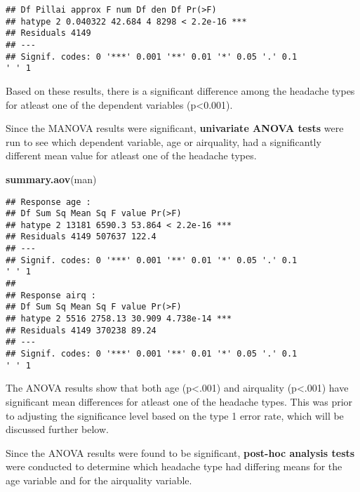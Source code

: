 \documentclass[]{article}
\newenvironment{Shaded}{\begin{snugshade}}{\end{snugshade}}
\newcommand{\KeywordTok}[1]{\textcolor[rgb]{0.13,0.29,0.53}{\textbf{#1}}}
\newcommand{\NormalTok}[1]{#1}
\newcommand{\OperatorTok}[1]{\textcolor[rgb]{0.81,0.36,0.00}{\textbf{#1}}}
\newcommand{\StringTok}[1]{\textcolor[rgb]{0.31,0.60,0.02}{#1}}
\begin{document}
\begin{verbatim}
## Df Pillai approx F num Df den Df Pr(>F)
## hatype 2 0.040322 42.684 4 8298 < 2.2e-16 ***
## Residuals 4149
## ---
## Signif. codes: 0 '***' 0.001 '**' 0.01 '*' 0.05 '.' 0.1
' ' 1
\end{verbatim}

Based on these results, there is a significant difference among the
headache types for atleast one of the dependent variables
(p\textless{}0.001).

Since the MANOVA results were significant, \textbf{univariate ANOVA
tests} were run to see which dependent variable, age or airquality, had
a significantly different mean value for atleast one of the headache
types.

\begin{Shaded}
\begin{Highlighting}[]
\KeywordTok{summary.aov}\NormalTok{(man) }
\end{Highlighting}
\end{Shaded}

\begin{verbatim}
## Response age :
## Df Sum Sq Mean Sq F value Pr(>F)
## hatype 2 13181 6590.3 53.864 < 2.2e-16 ***
## Residuals 4149 507637 122.4
## ---
## Signif. codes: 0 '***' 0.001 '**' 0.01 '*' 0.05 '.' 0.1
' ' 1
##
## Response airq :
## Df Sum Sq Mean Sq F value Pr(>F)
## hatype 2 5516 2758.13 30.909 4.738e-14 ***
## Residuals 4149 370238 89.24
## ---
## Signif. codes: 0 '***' 0.001 '**' 0.01 '*' 0.05 '.' 0.1
' ' 1
\end{verbatim}

The ANOVA results show that both age (p\textless{}.001) and airquality
(p\textless{}.001) have significant mean differences for atleast one of
the headache types. This was prior to adjusting the significance level
based on the type 1 error rate, which will be discussed further below.

Since the ANOVA results were found to be significant, \textbf{post-hoc
analysis tests} were conducted to determine which headache type had
differing means for the age variable and for the airquality variable.

\begin{Shaded}
\end{Shaded}
\end{document}
